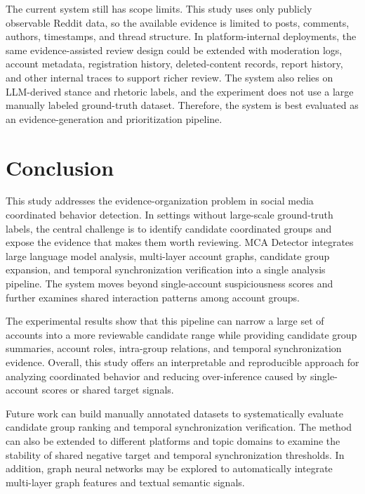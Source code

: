\documentclass[conference]{IEEEtran}
\begin{document}
The current system still has scope limits. This study uses only publicly observable Reddit data, so the available evidence is limited to posts, comments, authors, timestamps, and thread structure. In platform-internal deployments, the same evidence-assisted review design could be extended with moderation logs, account metadata, registration history, deleted-content records, report history, and other internal traces to support richer review. The system also relies on LLM-derived stance and rhetoric labels, and the experiment does not use a large manually labeled ground-truth dataset. Therefore, the system is best evaluated as an evidence-generation and prioritization pipeline.

\section{Conclusion}
This study addresses the evidence-organization problem in social media coordinated behavior detection. In settings without large-scale ground-truth labels, the central challenge is to identify candidate coordinated groups and expose the evidence that makes them worth reviewing. MCA Detector integrates large language model analysis, multi-layer account graphs, candidate group expansion, and temporal synchronization verification into a single analysis pipeline. The system moves beyond single-account suspiciousness scores and further examines shared interaction patterns among account groups.

The experimental results show that this pipeline can narrow a large set of accounts into a more reviewable candidate range while providing candidate group summaries, account roles, intra-group relations, and temporal synchronization evidence. Overall, this study offers an interpretable and reproducible approach for analyzing coordinated behavior and reducing over-inference caused by single-account scores or shared target signals.

Future work can build manually annotated datasets to systematically evaluate candidate group ranking and temporal synchronization verification. The method can also be extended to different platforms and topic domains to examine the stability of shared negative target and temporal synchronization thresholds. In addition, graph neural networks may be explored to automatically integrate multi-layer graph features and textual semantic signals.
\end{document}

